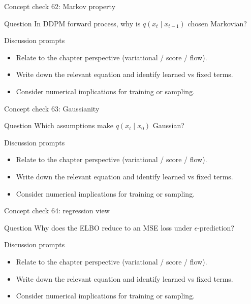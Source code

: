 \documentclass[aspectratio=169]{beamer}
\begin{document}
\begin{frame}{Concept check 62: Markov property}
\begin{block}{Question}
In DDPM forward process, why is \(q(x_t\mid x_{t-1})\) chosen Markovian?
\end{block}
\begin{block}{Discussion prompts}
\begin{itemize}
\item Relate to the chapter perspective (variational / score / flow).
\item Write down the relevant equation and identify learned vs fixed terms.
\item Consider numerical implications for training or sampling.
\end{itemize}
\end{block}
\end{frame}

\begin{frame}{Concept check 63: Gaussianity}
\begin{block}{Question}
Which assumptions make \(q(x_t\mid x_0)\) Gaussian?
\end{block}
\begin{block}{Discussion prompts}
\begin{itemize}
\item Relate to the chapter perspective (variational / score / flow).
\item Write down the relevant equation and identify learned vs fixed terms.
\item Consider numerical implications for training or sampling.
\end{itemize}
\end{block}
\end{frame}

\begin{frame}{Concept check 64: regression view}
\begin{block}{Question}
Why does the ELBO reduce to an MSE loss under \(\epsilon\)-prediction?
\end{block}
\begin{block}{Discussion prompts}
\begin{itemize}
\item Relate to the chapter perspective (variational / score / flow).
\item Write down the relevant equation and identify learned vs fixed terms.
\item Consider numerical implications for training or sampling.
\end{itemize}
\end{block}
\end{frame}
\end{document}
